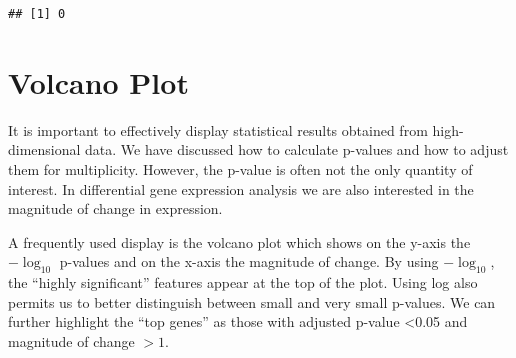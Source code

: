 \documentclass[
]{book}
\newenvironment{Shaded}{\begin{snugshade}}{\end{snugshade}}
\newcommand{\AttributeTok}[1]{\textcolor[rgb]{0.77,0.63,0.00}{#1}}
\newcommand{\ControlFlowTok}[1]{\textcolor[rgb]{0.13,0.29,0.53}{\textbf{#1}}}
\newcommand{\DecValTok}[1]{\textcolor[rgb]{0.00,0.00,0.81}{#1}}
\newcommand{\FunctionTok}[1]{\textcolor[rgb]{0.00,0.00,0.00}{#1}}
\newcommand{\NormalTok}[1]{#1}
\newcommand{\OtherTok}[1]{\textcolor[rgb]{0.56,0.35,0.01}{#1}}
\newcommand{\SpecialCharTok}[1]{\textcolor[rgb]{0.00,0.00,0.00}{#1}}
\begin{document}
\begin{verbatim}
## [1] 0
\end{verbatim}

\hypertarget{volcano-plot}{%
\section{Volcano Plot}\label{volcano-plot}}

It is important to effectively display statistical results obtained from high-dimensional data. We have discussed how to calculate p-values and how to adjust them for multiplicity. However, the p-value is often not the only quantity of interest. In differential gene expression analysis we are also interested in the magnitude of change in expression.

\begin{Shaded}
\end{Shaded}

A frequently used display is the volcano plot which shows on the y-axis the \(-\log_{10}\) p-values and on the x-axis the magnitude of change. By using \(-\log_{10}\), the ``highly significant'' features appear at the top of the plot. Using log also permits us to better distinguish between small and very small p-values. We can further highlight the ``top genes'' as those with adjusted p-value \textless0.05 and magnitude of change \(>1\).
\end{document}
